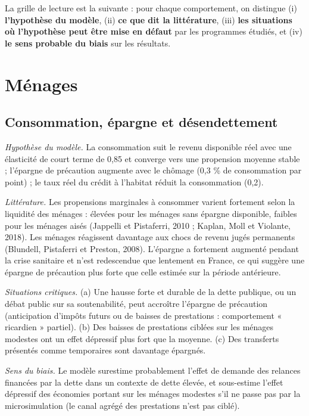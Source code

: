 \documentclass[
  11pt,
  11pt,
  a4paper,
  openany]{book}
\begin{document}
La grille de lecture est la suivante : pour chaque comportement, on
distingue (i) \textbf{l'hypothèse du modèle}, (ii) \textbf{ce que dit la
littérature}, (iii) \textbf{les situations où l'hypothèse peut être mise
en défaut} par les programmes étudiés, et (iv) \textbf{le sens probable
du biais} sur les résultats.

\hypertarget{muxe9nages}{%
\section{Ménages}\label{muxe9nages}}

\hypertarget{consommation-uxe9pargne-et-duxe9sendettement}{%
\subsection{Consommation, épargne et
désendettement}\label{consommation-uxe9pargne-et-duxe9sendettement}}

\emph{Hypothèse du modèle.} La consommation suit le revenu disponible
réel avec une élasticité de court terme de 0,85 et converge vers une
propension moyenne stable ; l'épargne de précaution augmente avec le
chômage (0,3 \% de consommation par point) ; le taux réel du crédit à
l'habitat réduit la consommation (0,2).

\emph{Littérature.} Les propensions marginales à consommer varient
fortement selon la liquidité des ménages : élevées pour les ménages sans
épargne disponible, faibles pour les ménages aisés (Jappelli et
Pistaferri, 2010 ; Kaplan, Moll et Violante, 2018). Les ménages
réagissent davantage aux chocs de revenu jugés permanents (Blundell,
Pistaferri et Preston, 2008). L'épargne a fortement augmenté pendant la
crise sanitaire et n'est redescendue que lentement en France, ce qui
suggère une épargne de précaution plus forte que celle estimée sur la
période antérieure.

\emph{Situations critiques.} (a) Une hausse forte et durable de la dette
publique, ou un débat public sur sa soutenabilité, peut accroître
l'épargne de précaution (anticipation d'impôts futurs ou de baisses de
prestations : comportement « ricardien » partiel). (b) Des baisses de
prestations ciblées sur les ménages modestes ont un effet dépressif plus
fort que la moyenne. (c) Des transferts présentés comme temporaires sont
davantage épargnés.

\emph{Sens du biais.} Le modèle surestime probablement l'effet de
demande des relances financées par la dette dans un contexte de dette
élevée, et sous-estime l'effet dépressif des économies portant sur les
ménages modestes s'il ne passe pas par la microsimulation (le canal
agrégé des prestations n'est pas ciblé).
\end{document}
